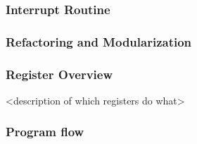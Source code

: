 \subsubsection{Interrupt Routine}

\subsubsection{Refactoring and Modularization}

\subsubsection{Register Overview}

<description of which registers do what>

\subsubsection{Program flow}



